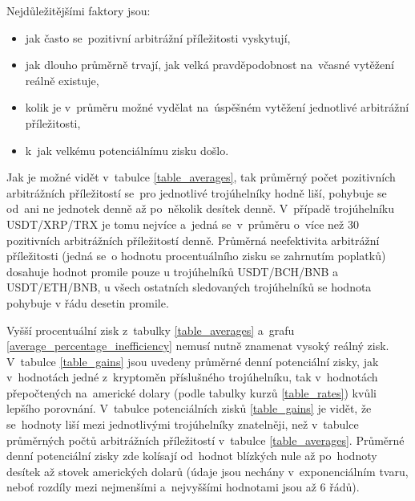 \documentclass[thesis=B,czech]{FITthesis}[2019/03/21]
\begin{document}
Nejdůležitějšími faktory jsou: 
\begin{itemize}
    \item jak často se~pozitivní arbitrážní příležitosti vyskytují,
    \item jak dlouho průměrně trvají, jak velká pravděpodobnost na~včasné \linebreak vytěžení reálně existuje,
    \item kolik je v~průměru možné vydělat na~úspěšném vytěžení jednotlivé arbitrážní příležitosti,
    \item k~jak velkému potenciálnímu zisku došlo.
\end{itemize}
Jak je možné vidět v~tabulce \ref{table_averages}, tak průměrný počet pozitivních arbitrážních příležitostí se~pro jednotlivé trojúhelníky hodně liší, pohybuje se od~ani ne jednotek denně až po~několik desítek denně. V~případě trojúhelníku  \linebreak USDT/XRP/TRX je tomu nejvíce a~jedná se~v~průměru o~více než 30 pozitivních arbitrážních příležitostí denně. Průměrná neefektivita arbitrážní příležitosti (jedná se~o hodnotu procentuálního zisku se zahrnutím poplatků) dosahuje hodnot promile pouze u trojúhelníků USDT/BCH/BNB \linebreak a USDT/ETH/BNB, u všech ostatních sledovaných trojúhelníků se hodnota pohybuje v řádu desetin promile.

Vyšší procentuální zisk z~tabulky \ref{table_averages} a~grafu \ref{average_percentage_inefficiency} nemusí nutně znamenat vysoký reálný zisk. V~tabulce \ref{table_gains} jsou uvedeny průměrné denní potenciální zisky, jak v~hodnotách jedné z~kryptoměn příslušného trojúhelníku, tak v~hodnotách přepočtených na~americké dolary (podle tabulky kurzů \ref{table_rates}) kvůli lepšího porovnání. V~tabulce potenciálních zisků \ref{table_gains} je vidět, že se~hodnoty liší mezi jednotlivými trojúhelníky znatelněji, než v~tabulce průměrných počtů arbitrážních příležitostí v~tabulce \ref{table_averages}. Průměrné denní potenciální zisky zde kolísají od~hodnot blízkých nule až po~hodnoty desítek až stovek amerických dolarů (údaje jsou nechány v~exponenciálním tvaru, neboť rozdíly mezi nejmenšími a~nejvyššími hodnotami jsou až 6 řádů). 


\end{document}

